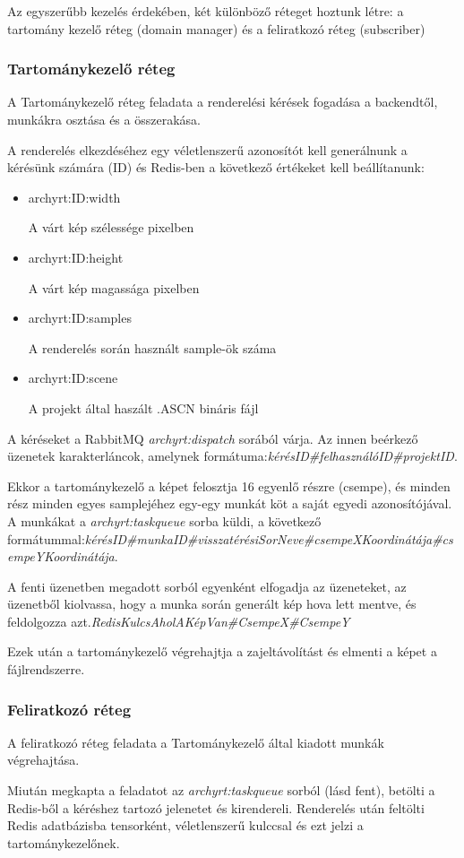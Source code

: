 Az egyszerűbb kezelés érdekében, két különböző réteget hoztunk létre: a tartomány kezelő réteg (domain manager) és a feliratkozó réteg (subscriber)

\subsubsection{Tartománykezelő réteg}
A Tartománykezelő réteg feladata a renderelési kérések fogadása a backendtől, munkákra osztása és a összerakása.

A renderelés elkezdéséhez egy véletlenszerű azonosítót kell generálnunk a kérésünk számára (ID) és Redis-ben a következő értékeket kell beállítanunk:

\begin{itemize}
    \item archyrt:ID:width
    
    A várt kép szélessége pixelben
    \item archyrt:ID:height
    
    A várt kép magassága pixelben
    \item archyrt:ID:samples
    
    A renderelés során használt sample-ök száma
    \item archyrt:ID:scene
    
    A projekt által haszált .ASCN bináris fájl
\end{itemize}

A kéréseket a RabbitMQ \emph{archyrt:dispatch} sorából várja. Az innen beérkező üzenetek karakterláncok, amelynek formátuma:\emph{kérésID\#felhasználóID\#projektID}.

Ekkor a tartománykezelő a képet felosztja 16 egyenlő részre (csempe), és minden rész minden egyes samplejéhez egy-egy munkát köt a saját egyedi azonosítójával. A munkákat a \emph{archyrt:taskqueue} sorba küldi, a következő formátummal:\linebreak\emph{kérésID\#munkaID\#visszatérésiSorNeve\#csempeXKoordinátája\#csempeYKoordinátája}.

A fenti üzenetben megadott sorból egyenként elfogadja az üzeneteket, az üzenetből kiolvassa, hogy a munka során generált kép hova lett mentve, és feldolgozza azt.\linebreak \emph{RedisKulcsAholAKépVan\#CsempeX\#CsempeY}

Ezek után a tartománykezelő végrehajtja a zajeltávolítást és elmenti a képet a fájlrendszerre.

\subsubsection{Feliratkozó réteg}
A feliratkozó réteg feladata a Tartománykezelő által kiadott munkák végrehajtása. 

Miután megkapta a feladatot az \emph{archyrt:taskqueue} sorból (lásd fent), betölti a Redis-ből a kéréshez tartozó jelenetet és kirendereli. Renderelés után feltölti Redis adatbázisba tensorként, véletlenszerű kulccsal és ezt jelzi a tartománykezelőnek.